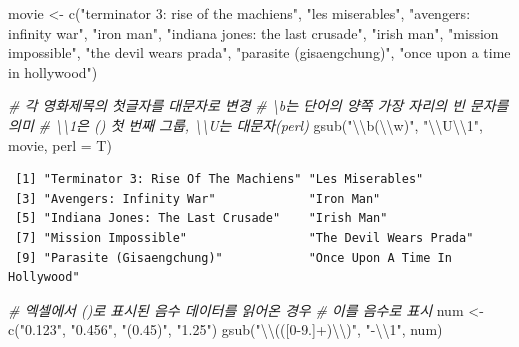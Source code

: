 \documentclass[
  11pt,
]{krantz}
\newenvironment{Shaded}{\begin{snugshade}}{\end{snugshade}}
\newcommand{\AttributeTok}[1]{\textcolor[rgb]{0.61,0.61,0.61}{#1}}
\newcommand{\CommentTok}[1]{\textcolor[rgb]{0.37,0.37,0.37}{\textit{#1}}}
\newcommand{\FunctionTok}[1]{\textcolor[rgb]{0,0,0}{#1}}
\newcommand{\NormalTok}[1]{#1}
\newcommand{\OtherTok}[1]{\textcolor[rgb]{0.37,0.37,0.37}{#1}}
\newcommand{\SpecialCharTok}[1]{\textcolor[rgb]{0,0,0}{#1}}
\newcommand{\StringTok}[1]{\textcolor[rgb]{0.5,0.5,0.5}{#1}}
\begin{document}
\begin{Shaded}
\begin{Highlighting}[]
\NormalTok{movie }\OtherTok{\textless{}{-}} \FunctionTok{c}\NormalTok{(}\StringTok{"terminator 3: rise of the machiens"}\NormalTok{, }
           \StringTok{"les miserables"}\NormalTok{, }
           \StringTok{"avengers: infinity war"}\NormalTok{, }
           \StringTok{"iron man"}\NormalTok{, }
           \StringTok{"indiana jones: the last crusade"}\NormalTok{, }
           \StringTok{"irish man"}\NormalTok{, }
           \StringTok{"mission impossible"}\NormalTok{, }
           \StringTok{"the devil wears prada"}\NormalTok{, }
           \StringTok{"parasite (gisaengchung)"}\NormalTok{, }
           \StringTok{"once upon a time in hollywood"}\NormalTok{)}

\CommentTok{\# 각 영화제목의 첫글자를 대문자로 변경}
\CommentTok{\# \textbackslash{}b는 단어의 양쪽 가장 자리의 빈 문자를 의미}
\CommentTok{\# \textbackslash{}\textbackslash{}1은 () 첫 번째 그룹, \textbackslash{}\textbackslash{}U는 대문자(perl)}
\FunctionTok{gsub}\NormalTok{(}\StringTok{"}\SpecialCharTok{\textbackslash{}\textbackslash{}}\StringTok{b(}\SpecialCharTok{\textbackslash{}\textbackslash{}}\StringTok{w)"}\NormalTok{, }\StringTok{"}\SpecialCharTok{\textbackslash{}\textbackslash{}}\StringTok{U}\SpecialCharTok{\textbackslash{}\textbackslash{}}\StringTok{1"}\NormalTok{, movie, }\AttributeTok{perl =}\NormalTok{ T)}
\end{Highlighting}
\end{Shaded}

\begin{verbatim}
 [1] "Terminator 3: Rise Of The Machiens" "Les Miserables"                    
 [3] "Avengers: Infinity War"             "Iron Man"                          
 [5] "Indiana Jones: The Last Crusade"    "Irish Man"                         
 [7] "Mission Impossible"                 "The Devil Wears Prada"             
 [9] "Parasite (Gisaengchung)"            "Once Upon A Time In Hollywood"     
\end{verbatim}

\begin{Shaded}
\begin{Highlighting}[]
\CommentTok{\# 엑셀에서 ()로 표시된 음수 데이터를 읽어온 경우}
\CommentTok{\# 이를 음수로 표시}
\NormalTok{num }\OtherTok{\textless{}{-}} \FunctionTok{c}\NormalTok{(}\StringTok{"0.123"}\NormalTok{, }\StringTok{"0.456"}\NormalTok{, }\StringTok{"(0.45)"}\NormalTok{, }\StringTok{"1.25"}\NormalTok{)}
\FunctionTok{gsub}\NormalTok{(}\StringTok{"}\SpecialCharTok{\textbackslash{}\textbackslash{}}\StringTok{(([0{-}9.]+)}\SpecialCharTok{\textbackslash{}\textbackslash{}}\StringTok{)"}\NormalTok{, }\StringTok{"{-}}\SpecialCharTok{\textbackslash{}\textbackslash{}}\StringTok{1"}\NormalTok{, num)}
\end{Highlighting}
\end{Shaded}
\end{document}
